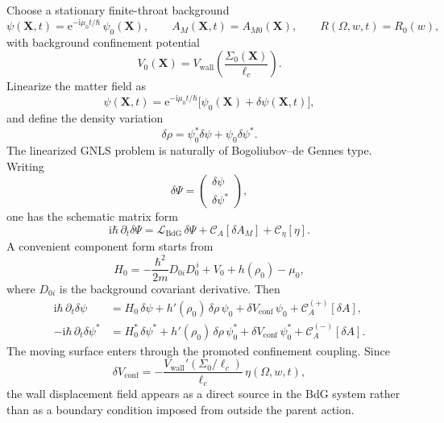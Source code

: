 \documentclass[11pt]{article}
\theoremstyle{definition}
\newcommand{\ii}{\mathrm{i}}
\newcommand{\ee}{\mathrm{e}}
\newcommand{\conf}{\mathrm{conf}}
\newcommand{\wall}{\mathrm{wall}}
\newcommand{\cL}{\mathcal L}
\newcommand{\cC}{\mathcal C}
\begin{document}
Choose a stationary finite-throat background
\begin{equation}
\psi(\mathbf X,t)=\ee^{-\ii\mu_0 t/\hbar}\,\psi_0(\mathbf X),
\qquad
A_M(\mathbf X,t)=A_{M0}(\mathbf X),
\qquad
R(\Omega,w,t)=R_0(w),
\label{eq:linpde-stationary-background}
\end{equation}
with background confinement potential
\[
V_0(\mathbf X)=V_{\wall}\!\left(\frac{\Sigma_0(\mathbf X)}{\ell_c}\right).
\]
Linearize the matter field as
\begin{equation}
\psi(\mathbf X,t)=\ee^{-\ii\mu_0 t/\hbar}\bigl[\psi_0(\mathbf X)+\delta\psi(\mathbf X,t)\bigr],
\label{eq:linpde-psi-linearization}
\end{equation}
and define the density variation
\begin{equation}
\delta\rho
=
\psi_0^*\delta\psi+\psi_0\delta\psi^*.
\label{eq:linpde-delta-rho}
\end{equation}
The linearized GNLS problem is naturally of Bogoliubov--de Gennes type. Writing
\[
\delta\Psi=
\begin{pmatrix}
\delta\psi\\[2pt]
\delta\psi^*
\end{pmatrix},
\]
one has the schematic matrix form
\begin{equation}
\ii\hbar\,\partial_t\delta\Psi
=
\cL_{\mathrm{BdG}}\,\delta\Psi
+
\cC_A[\delta A_M]
+
\cC_\eta[\eta].
\label{eq:linpde-bdg-matrix}
\end{equation}
A convenient component form starts from
\begin{equation}
H_0=-\frac{\hbar^2}{2m}D_{0i}D_0^{\,i}+V_0+h(\rho_0)-\mu_0,
\label{eq:linpde-H0}
\end{equation}
where $D_{0i}$ is the background covariant derivative. Then
\begin{align}
\ii\hbar\,\partial_t\delta\psi
&=
H_0\,\delta\psi
+
h'(\rho_0)\,\delta\rho\,\psi_0
+
\delta V_{\conf}\,\psi_0
+
\cC_A^{(+)}[\delta A],
\label{eq:linpde-bdg-plus}
\\
-\ii\hbar\,\partial_t\delta\psi^*
&=
H_0^*\,\delta\psi^*
+
h'(\rho_0)\,\delta\rho\,\psi_0^*
+
\delta V_{\conf}\,\psi_0^*
+
\cC_A^{(-)}[\delta A].
\label{eq:linpde-bdg-minus}
\end{align}
The moving surface enters through the promoted confinement coupling. Since
\begin{equation}
\delta V_{\conf}
=
-\frac{V_{\wall}'(\Sigma_0/\ell_c)}{\ell_c}\,\eta(\Omega,w,t),
\label{eq:linpde-delta-vconf}
\end{equation}
the wall displacement field appears as a direct source in the BdG system rather than as a boundary condition imposed from outside the parent action.
\end{document}

